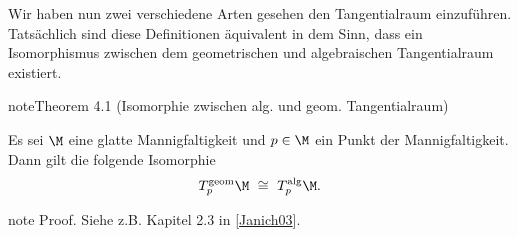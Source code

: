 \documentclass[letterpaper,10pt,german]{jupyterBook}
\begin{document}
\sphinxAtStartPar
Wir haben nun zwei verschiedene Arten gesehen den Tangentialraum einzuführen.
Tatsächlich sind diese Definitionen äquivalent in dem Sinn, dass ein Isomorphismus zwischen dem geometrischen und algebraischen Tangentialraum existiert.
\label{manifolds/tangential:theorem-11}
\begin{sphinxadmonition}{note}{Theorem 4.1 (Isomorphie zwischen alg. und geom. Tangentialraum)}



\sphinxAtStartPar
Es sei \(\M\) eine glatte Mannigfaltigkeit und \(p\in\M\) ein Punkt der Mannigfaltigkeit.
Dann gilt die folgende Isomorphie
\begin{equation*}
\begin{split}T^{\text{geom}}_p\M \ \cong \ T^{\text{alg}}_p\M.\end{split}
\end{equation*}\end{sphinxadmonition}

\begin{sphinxadmonition}{note}
\sphinxAtStartPar
Proof. Siehe z.B. Kapitel 2.3 in {[}\hyperlink{cite.references:id17}{Janich03}{]}.
\end{sphinxadmonition}
\end{document}
